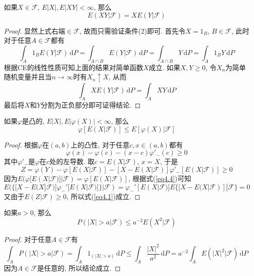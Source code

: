 \documentclass[cn, 12pt, math=mtpro2, bibstyle=apa, blue, twocol]{elegantbook}
\newcommand{\F}{\mathcal{F}}
\begin{document}
\begin{theorem}\label{thm:thm4.3}
  如果$X\in\F$, $E|X|, E|XY|<\infty$, 那么
  \begin{equation}\label{eq4.4}
    E(XY|\F)=XE(Y|\F)
  \end{equation}
\end{theorem}
\begin{proof}
  显然上式右端$\in\F$, 故而只需验证条件(2)即可. 首先令$X=1_B$, $B\in\F$, 此时对于任意$A\in\F$都有
  $$\int_A1_BE(Y|\F)\,\text{d}P=\int_{A\cap B}E(Y|\F)\,\text{d}P=\int_{A\cap B}Y\,\text{d}P=\int_A1_BY\,\text{d}P$$
  根据CE的线性性质可知上面的结果对简单函数$X$成立. 如果$X,Y\geq0$, 令$X_n$为简单随机变量并且当$n\to\infty$时有$X_n\uparrow X$, 从而
  $$\int_AXE(Y|\F)\,\text{d}P=\int_AXY\,\text{d}P$$
  最后将$X$和$Y$分割为正负部分即可证得结论.
\end{proof}

\begin{theorem}[Jensen不等式]
  如果$\varphi$是凸的, $E|X|, E|\varphi(X)|<\infty$, 那么
  \begin{equation}\label{eq4.1}
    \varphi[E(X|\F)]\leq E[\varphi(X)|\F]
  \end{equation}
\end{theorem}
\begin{proof}
  根据$\varphi$在$(a,b)$上的凸性, 对于任意$c, x\in(a,b)$都有
  \begin{equation}\label{eq4.2}
    \varphi(x)-\varphi(c)-(x-c)\varphi'_{-}(c)\ge0
  \end{equation}
  其中$\varphi'_{-}$是$\varphi$在$c$处的左导数. 取$c=E(X|\F)$, $x=X$, 于是
  \begin{equation}\label{eq4.3}
    Z=\varphi(Y)-\varphi[E(X|\F)]-[X-E(X|\F)]\varphi'_{-}[E(X|\F)]\ge0
  \end{equation}
  因为$E(\varphi[E(X|\F)]|\F)=\varphi[E(X|\F)]$, 根据式(\ref{eq4.4})可知
  $$E(\{[X-E(X|\F)]\varphi_{-}'[E(X|\F)]\}|\F)=\varphi_{-}'[E(X|\F)]E\{[X-E(X|\F)]|\F\}=0$$
  又由于$E(Z|\F)\ge0$, 所以式(\ref{eq4.1})成立.
\end{proof}

\begin{theorem}[Chebyshev不等式]
  如果$a>0$, 那么
  $$P(|X|>a|\F)\leq a^{-2}E(X^2|\F)$$
\end{theorem}
\begin{proof}
  对于任意$A\in\F$有
  $$\int_AP(|X|>a|\F)=\int_A1_{(|X|>a)}\,\text{d}P\leq \int_A\frac{|X|^2}{a^2}\,\text{d}P=a^{-2}\int_AE(|X|^2|\F)\,\text{d}P$$
  因为$A\in\F$是任意的, 所以结论成立.
\end{proof}
\end{document}
